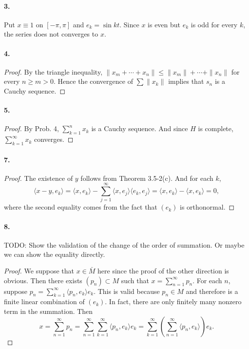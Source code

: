   \paragraph{3.}
  \begin{solution}
    Put $x\equiv 1$ on $[-\pi,\pi]$ and $e_k=\sin kt$. Since $x$ is even but 
    $e_k$ is odd for every $k$, the series does not converges to $x$.
  \end{solution}
  
  \paragraph{4.}
  \begin{proof}
    By the triangle inequality, $\|x_m+\cdots+x_n\| \le \|x_m\|+\cdots+\|x_n\|$
    for every $n\ge m>0$. Hence the convergence of $\sum \|x_k\|$ implies that
    $s_n$ is a Cauchy sequence.
  \end{proof}
  
  \paragraph{5.}
  \begin{proof}
    By Prob. 4, $\sum_{k=1}^n x_k$ is a Cauchy sequence. And since $H$ is 
    complete, $\sum_{k=1}^\infty x_k$ converges.
  \end{proof}
  
  \paragraph{7.}
  \begin{proof}
    The existence of $y$ follows from Theorem 3.5-2(c). And for each $k$,
    \[
      \langle x-y,e_k\rangle =
      \langle x,e_k\rangle - 
      \sum_{j=1}^\infty\langle x,e_j\rangle\langle e_k,e_j\rangle =
      \langle x,e_k\rangle - \langle x,e_k\rangle = 0,
    \]
    where the second equality comes from the fact that $(e_k)$ is orthonormal.
  \end{proof}
  
  \paragraph{8.}
    TODO: Show the validation of the change of the order of summation. Or maybe
    we can show the equality directly.
  \begin{proof}
    We suppose that $x\in\bar{M}$ here since the proof of the other direction is
    obvious. Then there exists $(p_n)\subset M$ such that $x=\sum_{n=1}^\infty
    p_n$. For each $n$, suppose $p_n=\sum_{k=1}^\infty \langle p_n,e_k\rangle 
    e_k$. This is valid because $p_n\in M$ and therefore is a finite linear 
    combination of $(e_k)$. In fact, there are only finitely many nonzero term
    in the summation. Then
    \[
      x=\sum_{n=1}^\infty p_n = 
      \sum_{n=1}^\infty\sum_{k=1}^\infty\langle p_n,e_k\rangle e_k=
      \sum_{k=1}^\infty\left(\sum_{n=1}^\infty\langle p_n,e_k\rangle\right)e_k.
    \]
  \end{proof}
  
